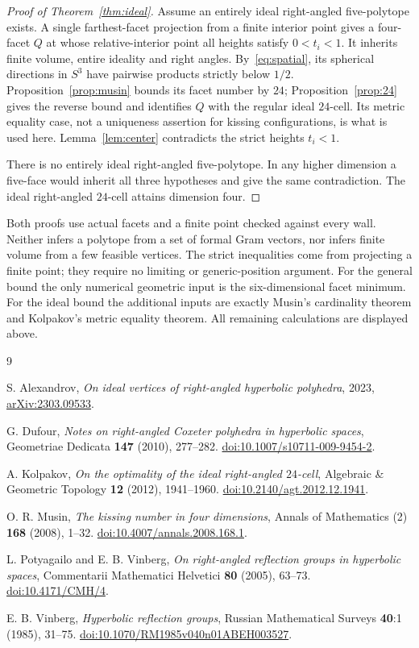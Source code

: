 \documentclass[11pt]{article}
\theoremstyle{remark}
\begin{document}
\begin{proof}[Proof of Theorem~\ref{thm:ideal}]
Assume an entirely ideal right-angled five-polytope exists. A single
farthest-facet projection from a finite interior point gives a
four-facet $Q$ at whose relative-interior point all heights satisfy
$0<t_i<1$. It inherits finite volume, entire ideality and right angles.
By~\eqref{eq:spatial}, its spherical directions in $S^3$ have
pairwise products strictly below $1/2$. Proposition~\ref{prop:musin}
bounds its facet number by $24$; Proposition~\ref{prop:24} gives the
reverse bound and identifies $Q$ with the regular ideal $24$-cell.
Its metric equality case, not a uniqueness assertion for kissing
configurations, is what is used here. Lemma~\ref{lem:center}
contradicts the strict heights $t_i<1$.

There is no entirely ideal right-angled five-polytope. In any higher
dimension a five-face would inherit all three hypotheses and give
the same contradiction. The ideal right-angled $24$-cell attains
dimension four.
\end{proof}

Both proofs use actual facets and a finite point checked against
every wall. Neither infers a polytope from a set of formal Gram
vectors, nor infers finite volume from a few feasible vertices.
The strict inequalities come from projecting a finite point;
they require no limiting or generic-position argument. For the
general bound the only numerical geometric input is the
six-dimensional facet minimum. For the ideal bound the additional
inputs are exactly Musin's cardinality theorem and Kolpakov's metric
equality theorem. All remaining calculations are displayed above.

\begin{thebibliography}{9}
\raggedright
{}
S. Alexandrov, \emph{On ideal vertices of right-angled hyperbolic
polyhedra}, 2023, \href{https://arxiv.org/abs/2303.09533}{arXiv:2303.09533}.

G. Dufour, \emph{Notes on right-angled Coxeter polyhedra in hyperbolic
spaces}, Geometriae Dedicata \textbf{147} (2010), 277--282.
\href{https://doi.org/10.1007/s10711-009-9454-2}{doi:10.1007/s10711-009-9454-2}.

A. Kolpakov, \emph{On the optimality of the ideal right-angled
$24$-cell}, Algebraic \& Geometric Topology \textbf{12} (2012),
1941--1960.
\href{https://doi.org/10.2140/agt.2012.12.1941}{doi:10.2140/agt.2012.12.1941}.

O. R. Musin, \emph{The kissing number in four dimensions}, Annals of
Mathematics (2) \textbf{168} (2008), 1--32.
\href{https://doi.org/10.4007/annals.2008.168.1}{doi:10.4007/annals.2008.168.1}.

L. Potyagailo and E. B. Vinberg, \emph{On right-angled reflection
groups in hyperbolic spaces}, Commentarii Mathematici Helvetici
\textbf{80} (2005), 63--73.
\href{https://doi.org/10.4171/CMH/4}{doi:10.4171/CMH/4}.

E. B. Vinberg, \emph{Hyperbolic reflection groups}, Russian Mathematical
Surveys \textbf{40}:1 (1985), 31--75.
\href{https://doi.org/10.1070/RM1985v040n01ABEH003527}{doi:10.1070/RM1985v040n01ABEH003527}.
\end{thebibliography}
\end{document}
